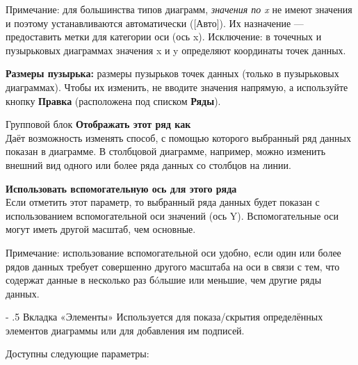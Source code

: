 ﻿\documentclass[a4paper,10pt]{article}
\makeatletter
\newenvironment{myindentpar}[1]%
 {\begin{list}{}%
         {\setlength{\leftmargin}{#1}}%
         \item[]%
 }
 {\end{list}}
\renewcommand\paragraph{%
   \@startsection{paragraph}{4}{0mm}%
      {-\baselineskip}%
      {.5\baselineskip}%
      {\normalfont\normalsize\bfseries}}
\makeatother
\begin{document}
\begin{itemize}
\begin{myindentpar}{1cm}
 Примечание: для большинства типов диаграмм, \textit{значения по x} не имеют значения и поэтому устанавливаются автоматически ([Авто]). Их назначение — предоставить метки для категории оси (ось x). Исключение: в точечных и пузырьковых диаграммах значения x и y определяют координаты точек данных.
\end{myindentpar}

\textbf{Размеры пузырька:} размеры пузырьков точек данных (только в пузырьковых диаграммах). Чтобы их изменить, не вводите значения напрямую, а используйте кнопку \textbf{Правка} (расположена под списком \textbf{Ряды}).

\item Групповой блок \textbf{Отображать этот ряд как}\\
Даёт возможность изменять способ, с помощью которого выбранный ряд данных показан в диаграмме. В столбцовой диаграмме, например, можно изменить внешний вид одного или более ряда данных со столбцов на линии.
\item \textbf{Использовать вспомогательную ось для этого ряда}\\
Если отметить этот параметр, то выбранный ряда данных будет показан с использованием вспомогательной оси значений (ось Y). Вспомогательные оси могут иметь другой масштаб, чем основные.

\begin{myindentpar}{1cm}
 Примечание: использование вспомогательной оси удобно, если один или более рядов данных требует совершенно другого масштаба на оси в связи с тем, что содержат данные в несколько раз б\'{o}льшие или меньшие, чем другие ряды данных.
\end{myindentpar}
 \end{itemize}
 
 \paragraph{Вкладка «Элементы»}
 Используется для показа/скрытия определённых элементов диаграммы или для добавления им подписей.
 
 Доступны следующие параметры:
 
\end{document}
